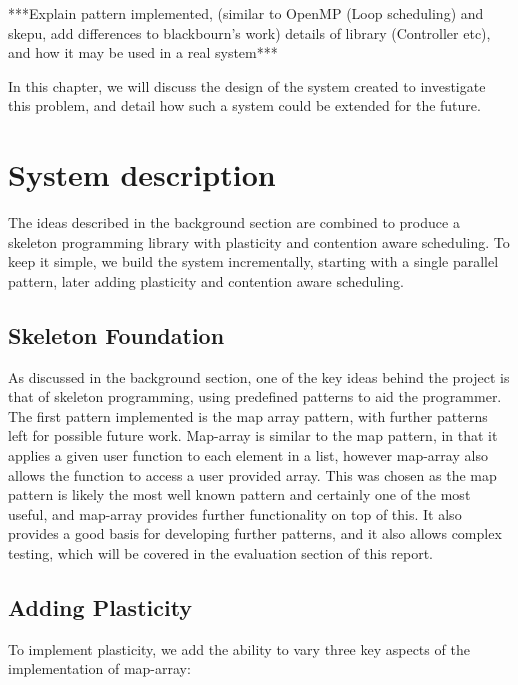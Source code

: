 ***Explain pattern implemented, (similar to OpenMP (Loop scheduling) and skepu, add differences to blackbourn's work) details of library (Controller etc), and how it may be used in a real system***

In this chapter, we will discuss the design of the system created to investigate this problem, and detail how such a system could be extended for the future.



\section{System description}

The ideas described in the background section are combined to produce a skeleton programming library with plasticity and contention aware scheduling. To keep it simple, we build the system incrementally, starting with a single parallel pattern, later adding plasticity and contention aware scheduling. 



\subsection{Skeleton Foundation}

As discussed in the background section, one of the key ideas behind the project is that of skeleton programming, using predefined patterns to aid the programmer. The first pattern implemented is the map array pattern, with further patterns left for possible future work. Map-array is similar to the map pattern, in that it applies a given user function to each element in a list, however map-array also allows the function to access a user provided array. This was chosen as the map pattern is likely the most well known pattern and certainly one of the most useful, and map-array provides further functionality on top of this. It also provides a good basis for developing further patterns, and it also allows complex testing, which will be covered in the evaluation section of this report.



\subsection{Adding Plasticity}

To implement plasticity, we add the ability to vary three key aspects of the implementation of map-array:

